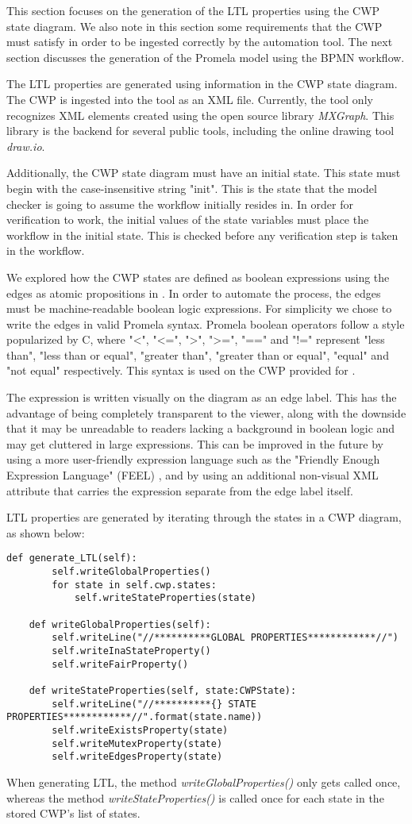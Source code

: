 This section focuses on the generation of the LTL properties using the CWP state diagram. We also note in this section some requirements that the CWP must satisfy in order to be ingested correctly by the automation tool. The next section discusses the generation of the Promela model using the BPMN workflow.

The LTL properties are generated using information in the CWP state diagram. The CWP is ingested into the tool as an XML file. Currently, the tool only recognizes XML elements created using the open source library \emph{MXGraph}. This library is the backend for several public tools, including the online drawing tool \emph{draw.io}.

Additionally, the CWP state diagram must have an initial state. This state must begin with the case-insensitive string "init". This is the state that the model checker is going to assume the workflow initially resides in. In order for verification to work, the initial values of the state variables must place the workflow in the initial state. This is checked before any verification step is taken in the workflow.

We explored how the CWP states are defined as boolean expressions using the edges as atomic propositions in . In order to automate the process, the edges must be machine-readable boolean logic expressions. For simplicity we chose to write the edges in valid Promela syntax. Promela boolean operators follow a style popularized by C, where "<", "<=", ">", ">=", "==" and "!=" represent "less than", "less than or equal", "greater than", "greater than or equal", "equal" and "not equal" respectively. This syntax is used on the CWP provided for \facetoface.

The expression is written visually on the diagram as an edge label. This has the advantage of being completely transparent to the viewer, along with the downside that it may be unreadable to readers lacking a background in boolean logic and may get cluttered in large expressions. This can be improved in the future by using a more user-friendly expression language such as the "Friendly Enough Expression Language" (FEEL) \cite{FEELSpecification}, and by using an additional non-visual XML attribute that carries the expression separate from the edge label itself.

LTL properties are generated by iterating through the states in a CWP diagram, as shown below:
\begin{lstlisting}[style=myPython]
    def generate_LTL(self):
        self.writeGlobalProperties()
        for state in self.cwp.states:
            self.writeStateProperties(state)
            
    def writeGlobalProperties(self):
        self.writeLine("//**********GLOBAL PROPERTIES************//")
        self.writeInaStateProperty()
        self.writeFairProperty()
        
    def writeStateProperties(self, state:CWPState):
        self.writeLine("//**********{} STATE PROPERTIES************//".format(state.name))
        self.writeExistsProperty(state)
        self.writeMutexProperty(state)
        self.writeEdgesProperty(state)
\end{lstlisting}

When generating LTL, the method \emph{writeGlobalProperties()} only gets called once, whereas the method \emph{writeStateProperties()} is called once for each state in the stored CWP's list of states.